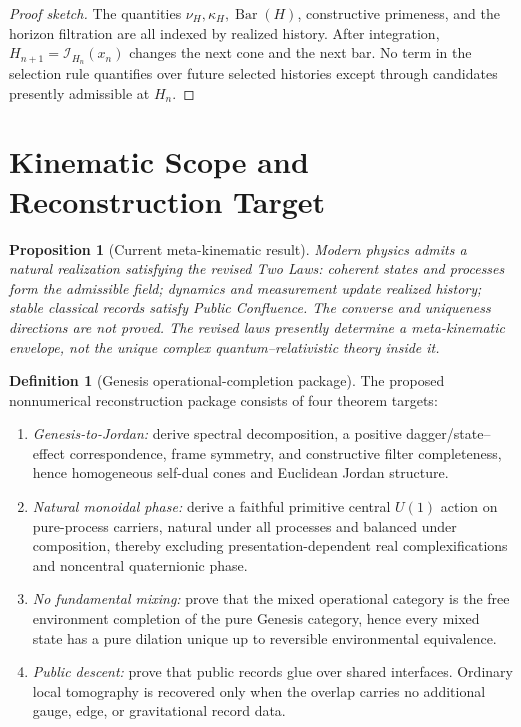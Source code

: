 \documentclass[11pt]{article}
\theoremstyle{plain}
\newtheorem{proposition}[theorem]{Proposition}
\theoremstyle{definition}
\newtheorem{definition}[theorem]{Definition}
\theoremstyle{remark}
\newenvironment{proofsketch}{\begin{proof}[Proof sketch]}{\end{proof}}
\newcommand{\I}{\mathcal{I}}
\newcommand{\SelBar}{\operatorname{Bar}}
\begin{document}
\begin{proofsketch}
The quantities \(\nu_H,\kappa_H,\SelBar(H)\), constructive primeness, and the horizon filtration are all indexed by realized history. After integration, \(H_{n+1}=\I_{H_n}(x_n)\) changes the next cone and the next bar. No term in the selection rule quantifies over future selected histories except through candidates presently admissible at \(H_n\).
\end{proofsketch}

\section{Kinematic Scope and Reconstruction Target}

\begin{proposition}[Current meta-kinematic result]
Modern physics admits a natural realization satisfying the revised Two Laws: coherent states and processes form the admissible field; dynamics and measurement update realized history; stable classical records satisfy Public Confluence. The converse and uniqueness directions are not proved. The revised laws presently determine a meta-kinematic envelope, not the unique complex quantum--relativistic theory inside it.
\end{proposition}

\begin{definition}[Genesis operational-completion package]
The proposed nonnumerical reconstruction package consists of four theorem targets:
\begin{enumerate}[leftmargin=*]
\item \emph{Genesis-to-Jordan:} derive spectral decomposition, a positive dagger/state--effect correspondence, frame symmetry, and constructive filter completeness, hence homogeneous self-dual cones and Euclidean Jordan structure.
\item \emph{Natural monoidal phase:} derive a faithful primitive central \(U(1)\) action on pure-process carriers, natural under all processes and balanced under composition, thereby excluding presentation-dependent real complexifications and noncentral quaternionic phase.
\item \emph{No fundamental mixing:} prove that the mixed operational category is the free environment completion of the pure Genesis category, hence every mixed state has a pure dilation unique up to reversible environmental equivalence.
\item \emph{Public descent:} prove that public records glue over shared interfaces. Ordinary local tomography is recovered only when the overlap carries no additional gauge, edge, or gravitational record data.
\end{enumerate}
\end{definition}
\end{document}
